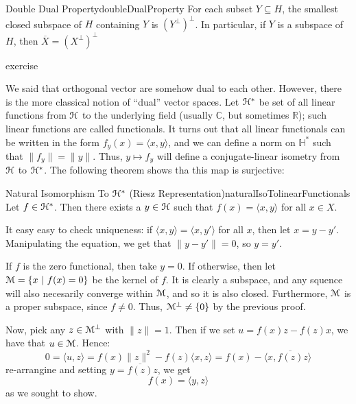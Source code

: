\documentclass[oneside]{book}
\newcommand{\R}{\mathbb{R}}
\newcommand{\C}{\mathbb{C}}
\renewcommand{\H}{\mathbb{H}}
\newcommand{\EH}{\EuScript{H}}
\newcommand{\EM}{\EuScript{M}}
\newcommand{\sse}{\subseteq}
\newcommand{\oln}{\overline}
\newcommand{\set}[2]{\left\{#1 \ \middle|\ #2\right\}}
\begin{document}
\begin{cor}{Double Dual Property}{doubleDualProperty}
	For each subset $Y \sse H$, the smallest closed subspace of $H$ containing $Y$ is $(Y^\perp)^\perp$. In
	particular, if $Y$ is a subspace of $H$, then $\oln{X} = (X^\perp)^\perp$
\end{cor}

\begin{Proof}
	exercise
\end{Proof}


We said that orthogonal vector are somehow dual to each other. However, there is the more classical notion of ``dual''
vector spaces. Let $\EH^*$ be set of all linear functions from $\EH$ to the underlying field (usually $\C$, but
sometimes $\R$); such linear functions are called functionals. It turns out that all linear functionals can be written
in the form $f_y(x) = \langle x,y \rangle$, and we can define a norm on $\H^*$ such that $\|f_y\| = \|y\|$. Thus, $y
\mapsto f_y$ will define a conjugate-linear isometry from $\EH$ to $\EH^*$. The following theorem shows tha this map is
surjective:

\begin{thm}{Natural Isomorphism To $\EH^*$ (Riesz Representation)}{naturalIsoTolinearFunctionals}
Let $f \in \EH^*$. Then there exists a $y \in \EH$ such that $f(x) = \langle x,y \rangle$ for all $x \in X$.
\end{thm}

\begin{Proof}
	It easy easy to check uniqueness: if $ \langle x,y \rangle = \langle x,y' \rangle$ for all $x$, then let $x = y-y'$.
	Manipulating the equation, we get that $\|y - y'\| = 0$, so $y = y'$.

	If $f$ is the zero functional, then take $y = 0$. If otherwise, then let $\EM = \set{x}{f(x) = 0}$ be the kernel of
	$f$. It is clearly a subspace, and any squence will also necesarily converge within $\EM$, and so it is also closed.
	Furthermore, $\EM$ is a proper subspace, since $f \ne 0$. Thus, $\EM^\perp \ne \{0\}$ by the previous proof.

	Now, pick any $z \in \EM^{\perp}$ with $\|z\|  =1$. Then if we set $u = f(x)z - f(z)x$, we have that $u \in \EM$.
	Hence:
	\[
		0 = \langle u,z \rangle = f(x)\|z\|^2 - f(z)\langle x,z\rangle = f(x) - \langle x, \oln{f(z)}z\rangle
	\]
	re-arrangine and setting $y = \oln{f(z)}z$, we get
	\[
		f(x) = \langle y,z \rangle
	\]
	as we sought to show.
\end{Proof}
\end{document}
